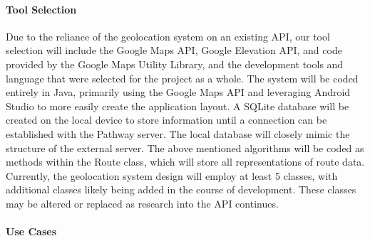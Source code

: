 ﻿\documentclass{article}
\begin{document}
\paragraph{Tool Selection}
Due to the reliance of the geolocation system on an existing API, our tool selection will include the Google Maps API\cite{G_API_Maps}, Google Elevation API\cite{g_API_Elev}, and code provided by the Google Maps Utility Library\cite{g_Util_Map}, and the development tools and language that were selected for the project as a whole. The system will be coded entirely in Java, primarily using the Google Maps API and leveraging Android Studio to more easily create the application layout. A SQLite database will be created on the local device to store information until a connection can be established with the Pathway server. The local database will closely mimic the structure of the external server. The above mentioned algorithms will be coded as methods within the Route class, which will store all representations of route data. Currently, the geolocation system design will employ at least 5 classes, with additional classes likely being added in the course of development. These classes may be altered or replaced as research into the API continues.

\paragraph{Use Cases}
\end{document}
